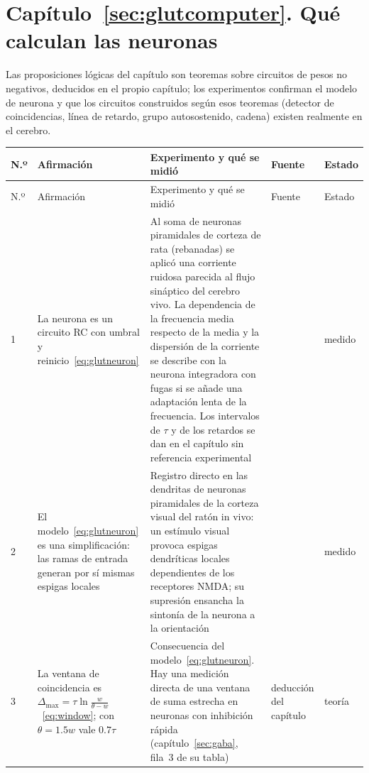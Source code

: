 \section{Capítulo~\ref{sec:glutcomputer}. Qué calculan las neuronas }

Las proposiciones lógicas del capítulo son teoremas sobre circuitos de pesos no negativos, deducidos en el propio capítulo; los experimentos confirman el modelo de neurona y que los circuitos construidos según esos teoremas (detector de coincidencias, línea de retardo, grupo autosostenido, cadena) existen realmente en el cerebro.

{\footnotesize
\setlength{\tabcolsep}{3pt}\renewcommand{\arraystretch}{1.15}
\begin{longtable}{>{\raggedright}p{0.5cm}>{\raggedright}p{4.0cm}>{\raggedright}p{5.6cm}>{\raggedright}p{2.3cm}>{\raggedright\arraybackslash}p{1.7cm}}
\toprule
N.º & Afirmación & Experimento y qué se midió & Fuente & Estado \\
\midrule\endfirsthead
\toprule
N.º & Afirmación & Experimento y qué se midió & Fuente & Estado \\
\midrule\endhead
1 & La neurona es un circuito RC con umbral y reinicio~\eqref{eq:glutneuron} & Al soma de neuronas piramidales de corteza de rata (rebanadas) se aplicó una corriente ruidosa parecida al flujo sináptico del cerebro vivo. La dependencia de la frecuencia media respecto de la media y la dispersión de la corriente se describe con la neurona integradora con fugas si se añade una adaptación lenta de la frecuencia. Los intervalos de $\tau$ y de los retardos se dan en el capítulo sin referencia experimental & \cite{Rauch2003} & medido \\
2 & El modelo~\eqref{eq:glutneuron} es una simplificación: las ramas de entrada generan por sí mismas espigas locales & Registro directo en las dendritas de neuronas piramidales de la corteza visual del ratón in vivo: un estímulo visual provoca espigas dendríticas locales dependientes de los receptores NMDA; su supresión ensancha la sintonía de la neurona a la orientación & \cite{Smith2013} & medido \\
3 & La ventana de coincidencia es $\Delta_{\max}=\tau\ln\frac{w}{\theta-w}$~\eqref{eq:window}; con $\theta=1.5w$ vale $0.7\tau$ & Consecuencia del modelo~\eqref{eq:glutneuron}. Hay una medición directa de una ventana de suma estrecha en neuronas con inhibición rápida (capítulo~\ref{sec:gaba}, fila~3 de su tabla) & deducción del capítulo & teoría \\

\end{longtable}}
